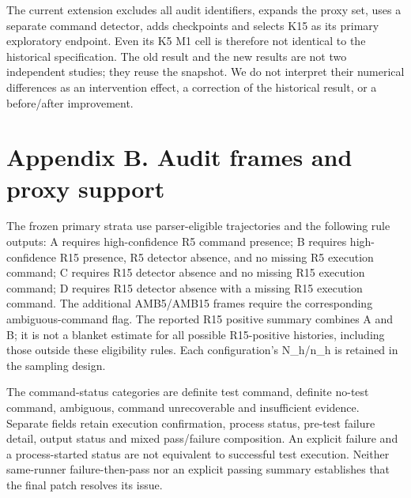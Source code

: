 \documentclass[10pt,a4paper]{article}
\begin{document}
The current extension excludes all audit identifiers, expands the proxy set, uses a separate command detector, adds checkpoints and selects K15 as its primary exploratory endpoint. Even its K5 M1 cell is therefore not identical to the historical specification. The old result and the new results are not two independent studies; they reuse the snapshot. We do not interpret their numerical differences as an intervention effect, a correction of the historical result, or a before/after improvement.

\section{Appendix B. Audit frames and proxy support}
The frozen primary strata use parser-eligible trajectories and the following rule outputs: A requires high-confidence R5 command presence; B requires high-confidence R15 presence, R5 detector absence, and no missing R5 execution command; C requires R15 detector absence and no missing R15 execution command; D requires R15 detector absence with a missing R15 execution command. The additional AMB5/AMB15 frames require the corresponding ambiguous-command flag. The reported R15 positive summary combines A and B; it is not a blanket estimate for all possible R15-positive histories, including those outside these eligibility rules. Each configuration's N\_h/n\_h is retained in the sampling design.

The command-status categories are definite test command, definite no-test command, ambiguous, command unrecoverable and insufficient evidence. Separate fields retain execution confirmation, process status, pre-test failure detail, output status and mixed pass/failure composition. An explicit failure and a process-started status are not equivalent to successful test execution. Neither same-runner failure-then-pass nor an explicit passing summary establishes that the final patch resolves its issue.
\end{document}
